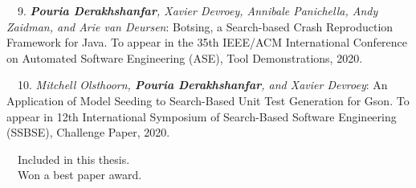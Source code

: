 \begin{etaremune}{\small
    \item[~~9.] \emph{\textbf{Pouria Derakhshanfar}, Xavier Devroey, Annibale Panichella, Andy Zaidman, and Arie van Deursen}: 
        Botsing, a Search-based Crash Reproduction Framework for Java.
        To appear in the 35th IEEE/ACM International Conference on Automated Software Engineering (ASE), Tool Demonstrations,
        2020.
}\end{etaremune}


\begin{etaremune}{\small
    \item[~~10.] \emph{Mitchell Olsthoorn, \textbf{Pouria Derakhshanfar}, and Xavier Devroey}: 
        An Application of Model Seeding to Search-Based Unit Test Generation for Gson.
        To appear in 12th International Symposium of Search-Based Software Engineering (SSBSE), Challenge Paper,
        2020.
}\end{etaremune}
\vspace{0.5cm}
\noindent
\faFileTextO~~Included in this thesis.\\
\faTrophy~~Won a best paper award.
